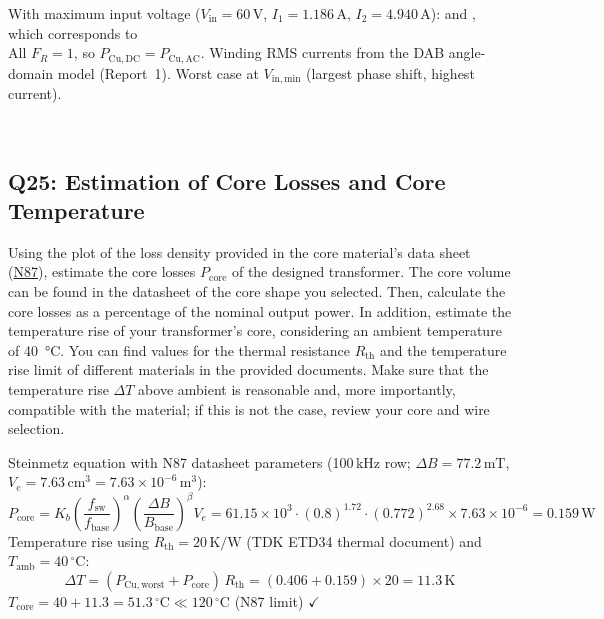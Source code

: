 \documentclass{PELsmallreport}
\begin{document}
With maximum input voltage ($V_\mathrm{in}=60\,\mathrm{V}$, $I_1=1.186\,\mathrm{A}$, $I_2=4.940\,\mathrm{A}$):
 and , which corresponds to \\

\noindent All $F_R=1$, so $P_\mathrm{Cu,DC} = P_\mathrm{Cu,AC}$. Winding RMS currents from the DAB angle-domain model (Report~1). Worst case at $V_\mathrm{in,min}$ (largest phase shift, highest current).

\hfill{}\\





\subsection{Q25: Estimation of Core Losses and Core Temperature} 
Using the plot of the loss density provided in the core material's data sheet (\href{https://www.tdk-electronics.tdk.com/download/528882/990c299b916e9f3eb7e44ad563b7f0b9/pdf-n87.pdf}{N87}), estimate the core losses $P_\mathrm{core}$ of the designed transformer. 
The core volume can be found in the datasheet of the core shape you selected. 
Then, calculate the core losses as a percentage of the nominal output power.
In addition, estimate the temperature rise of your transformer's core, considering an ambient temperature of \qty{40}{\celsius}. 
You can find values for the thermal resistance $R_\mathrm{th}$ and the temperature rise limit of different materials in the provided documents. 
Make sure that the temperature rise $\Delta T$ above ambient is reasonable and, more importantly, compatible with the material; if this is not the case, review your core and wire selection.

\begin{framed}
Steinmetz equation with N87 datasheet parameters (100\,kHz row; $\Delta B = 77.2\,\mathrm{mT}$, $V_e = 7.63\,\mathrm{cm}^3 = 7.63\!\times\!10^{-6}\,\mathrm{m}^3$):
\begin{equation}
    P_\mathrm{core} = K_b\!\left(\frac{f_\mathrm{sw}}{f_\mathrm{base}}\right)^\alpha\!\left(\frac{\Delta B}{B_\mathrm{base}}\right)^\beta\!V_e= 61.15\!\times\!10^3\cdot(0.8)^{1.72}\cdot(0.772)^{2.68}\times7.63\!\times\!10^{-6} = 0.159\,\mathrm{W}
\end{equation}
Temperature rise using $R_\mathrm{th}=20\,\mathrm{K/W}$ (TDK ETD34 thermal document) and $T_\mathrm{amb}=40\,^\circ\mathrm{C}$:
\begin{equation}
    \Delta T = (P_\mathrm{Cu,worst}+P_\mathrm{core})\,R_\mathrm{th} = (0.406+0.159)\times20 = 11.3\,\mathrm{K}
\end{equation}
$T_\mathrm{core} = 40+11.3 = 51.3\,^\circ\mathrm{C} \ll 120\,^\circ\mathrm{C}$ (N87 limit) $\checkmark$
\end{framed}
\end{document}
